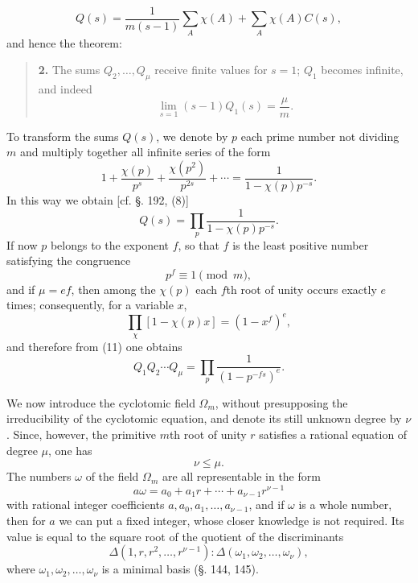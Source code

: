 \documentclass[11pt]{article}
\begin{document}
\[
Q(s)=\frac{1}{m(s-1)}\sum_A \chi(A)+\sum_A\chi(A)C(s),
\]
and hence the theorem:

\begin{quote}
\textbf{2.} The sums $Q_2,\ldots,Q_\mu$ receive finite values for $s=1$; $Q_1$ becomes infinite, and indeed
\[
\lim_{s=1}(s-1)Q_1(s)=\frac{\mu}{m}.
\]
\end{quote}

To transform the sums $Q(s)$, we denote by $p$ each prime number not dividing $m$ and multiply together all infinite series of the form
\[
1+\frac{\chi(p)}{p^s}+\frac{\chi(p^2)}{p^{2s}}+\cdots
=\frac{1}{1-\chi(p)p^{-s}}.
\]
In this way we obtain [cf. §. 192, (8)]
\begin{equation}\tag{11}
Q(s)=\prod_p \frac{1}{1-\chi(p)p^{-s}}.
\end{equation}
If now $p$ belongs to the exponent $f$, so that $f$ is the least positive number satisfying the congruence
\begin{equation}\tag{12}
p^f\equiv1 \pmod m,
\end{equation}
and if $\mu=ef$, then among the $\chi(p)$ each $f$th root of unity occurs exactly $e$ times; consequently, for a variable $x$,
\[
\prod_{\chi}[1-\chi(p)x]=(1-x^f)^e,
\]
and therefore from (11) one obtains
\begin{equation}\tag{13}
Q_1Q_2\cdots Q_\mu=\prod_p \frac{1}{(1-p^{-fs})^e}.
\end{equation}

We now introduce the cyclotomic field $\Omega_m$, without presupposing the irreducibility of the cyclotomic equation, and denote its still unknown degree by $\nu$. Since, however, the primitive $m$th root of unity $r$ satisfies a rational equation of degree $\mu$, one has
\begin{equation}\tag{14}
\nu\leq\mu.
\end{equation}
The numbers $\omega$ of the field $\Omega_m$ are all representable in the form
\begin{equation}\tag{15}
a\omega=a_0+a_1r+\cdots+a_{\nu-1}r^{\nu-1}
\end{equation}
with rational integer coefficients $a,a_0,a_1,\ldots,a_{\nu-1}$,
and if $\omega$ is a whole number, then for $a$ we can put a fixed integer, whose closer knowledge is not required. Its value is equal to the square root of the quotient of the discriminants
\[
\Delta(1,r,r^2,\ldots,r^{\nu-1}):\Delta(\omega_1,\omega_2,\ldots,\omega_\nu),
\]
where $\omega_1,\omega_2,\ldots,\omega_\nu$ is a minimal basis (§. 144, 145).
\end{document}
